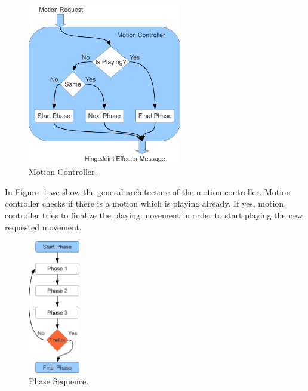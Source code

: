 \begin{figure}[t!]
\centering
  \includegraphics[width=0.6\textwidth]{Chapter3/figures/MotionController.pdf}
  \caption{Motion Controller.}
  \label{fig:MotionController}
\end{figure}


In Figure~\ref{fig:MotionController} we show the general architecture of the motion controller. Motion controller checks if there is a motion which is playing already. If yes, motion controller tries to finalize the playing movement in order to start playing the new requested movement.


\begin{figure}[t!]
\centering
  \includegraphics[width=0.2\textwidth]{Chapter3/figures/MotionSequence.pdf}
  \caption{Phase Sequence.}
  \label{fig:PhaseSequence}
\end{figure}


